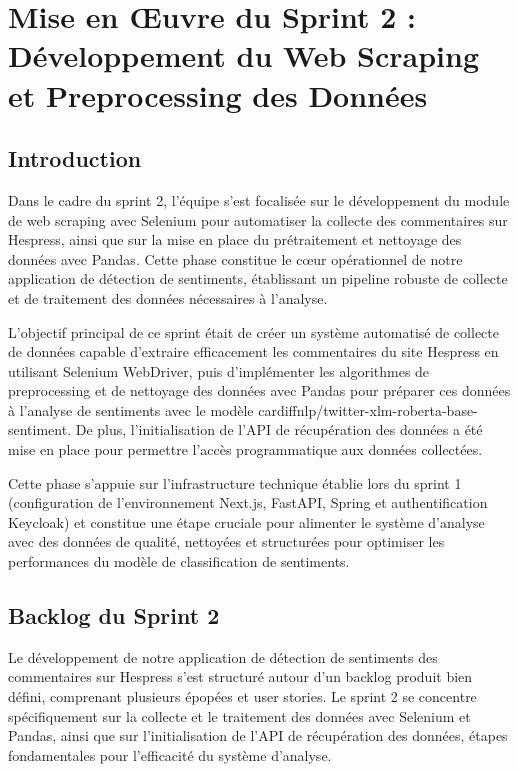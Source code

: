 \chapter{Mise en Œuvre du Sprint 2 : Développement du Web Scraping et Preprocessing des Données}

\section{Introduction}

Dans le cadre du sprint 2, l'équipe s'est focalisée sur le développement du module de web scraping avec Selenium pour automatiser la collecte des commentaires sur Hespress, ainsi que sur la mise en place du prétraitement et nettoyage des données avec Pandas. Cette phase constitue le cœur opérationnel de notre application de détection de sentiments, établissant un pipeline robuste de collecte et de traitement des données nécessaires à l'analyse.

L'objectif principal de ce sprint était de créer un système automatisé de collecte de données capable d'extraire efficacement les commentaires du site Hespress en utilisant Selenium WebDriver, puis d'implémenter les algorithmes de preprocessing et de nettoyage des données avec Pandas pour préparer ces données à l'analyse de sentiments avec le modèle cardiffnlp/twitter-xlm-roberta-base-sentiment. De plus, l'initialisation de l'API de récupération des données a été mise en place pour permettre l'accès programmatique aux données collectées.

Cette phase s'appuie sur l'infrastructure technique établie lors du sprint 1 (configuration de l'environnement Next.js, FastAPI, Spring et authentification Keycloak) et constitue une étape cruciale pour alimenter le système d'analyse avec des données de qualité, nettoyées et structurées pour optimiser les performances du modèle de classification de sentiments.

\section{Backlog du Sprint 2}

Le développement de notre application de détection de sentiments des commentaires sur Hespress s'est structuré autour d'un backlog produit bien défini, comprenant plusieurs épopées et user stories. Le sprint 2 se concentre spécifiquement sur la collecte et le traitement des données avec Selenium et Pandas, ainsi que sur l'initialisation de l'API de récupération des données, étapes fondamentales pour l'efficacité du système d'analyse.

